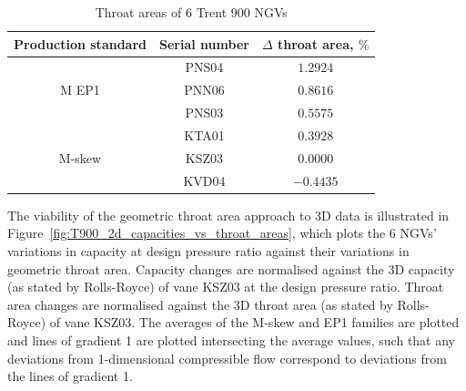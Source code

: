 \documentclass[a4paper, 11pt, oneside]{report}
\begin{document}
\begin{table}[H]
\caption{Throat areas of 6 Trent 900 NGVs}
\label{T900_throat_areas}
\begin{center}
\begin{tabular}{|c|c|c|}
\hline
Production standard & Serial number & $\Delta$ throat area, $\%$\\
\hline
\multirow{3}{*}{M EP1} & PNS04 & $1.2924$\\
 & PNN06 & $0.8616$\\
 & PNS03 & $0.5575$\\
 \hline
 \multirow{3}{*}{M-skew} & KTA01 & $0.3928$\\
 & KSZ03 & $0.0000$\\
 & KVD04 & $-0.4435$\\
\hline
\end{tabular}
\end{center}
\end{table}

The viability of the geometric throat area approach to 3D data is illustrated in Figure~\ref{fig:T900_2d_capacities_vs_throat_areas}, which plots the 6 NGVs' variations in capacity at design pressure ratio against their variations in geometric throat area. Capacity changes are normalised against the 3D capacity (as stated by Rolls-Royce) of vane KSZ03 at the design pressure ratio. Throat area changes are normalised against the 3D throat area (as stated by Rolls-Royce) of vane KSZ03. The averages of the M-skew and EP1 families are plotted and lines of gradient 1 are plotted intersecting the average values, such that any deviations from 1-dimensional compressible flow correspond to deviations from the lines of gradient 1.
\end{document}
